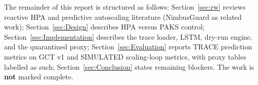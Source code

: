 The remainder of this report is structured as follows: Section~\ref{sec:rw} reviews reactive HPA and predictive autoscaling literature (NimbusGuard as related work); Section~\ref{sec:Design} describes HPA versus PAKS control; Section~\ref{sec:Implementation} describes the trace loader, LSTM, dry-run engine, and the quarantined proxy; Section~\ref{sec:Evaluation} reports TRACE prediction metrics on GCT v1 and SIMULATED scaling-loop metrics, with proxy tables labelled as such; Section~\ref{sec:Conclusion} states remaining blockers. The work is \textbf{not} marked complete.
